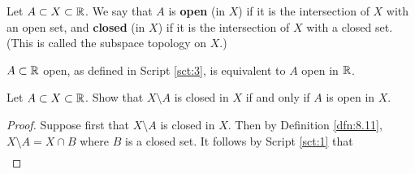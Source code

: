 \documentclass[../main.tex]{subfiles}
\begin{document}
\begin{definition}\label{dfn:8.11}
    Let $A\subset X\subset\mathbb{R}$. We say that $A$ is \textbf{open} (in $X$) if it is the intersection of $X$ with an open set, and \textbf{closed} (in $X$) if it is the intersection of $X$ with a closed set. (This is called the subspace topology on $X$.)
\end{definition}

\begin{remark}\label{rmk:8.12}
    $A\subset\mathbb{R}$ open, as defined in Script \ref{sct:3}, is equivalent to $A$ open in $\mathbb{R}$.
\end{remark}

\begin{exercise}\label{exr:8.13}
    Let $A\subset X\subset\mathbb{R}$. Show that $X\setminus A$ is closed in $X$ if and only if $A$ is open in $X$.
    \begin{proof}
        Suppose first that $X\setminus A$ is closed in $X$. Then by Definition \ref{dfn:8.11}, $X\setminus A=X\cap B$ where $B$ is a closed set. It follows by Script \ref{sct:1} that
        \begin{align*}

\end{align*}
\end{proof}
\end{exercise}
\end{document}

